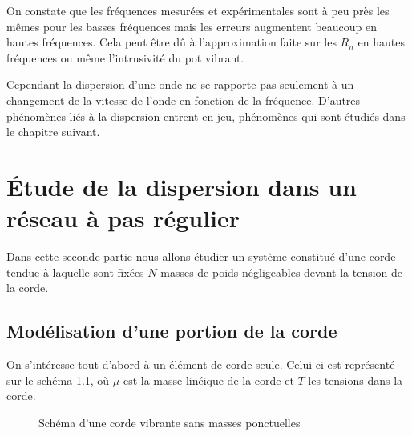 \documentclass[a4paper,11pt]{report} %
\begin{document}
\bigskip
On constate que les fréquences mesurées et expérimentales sont à peu près les mêmes pour les basses fréquences mais les erreurs augmentent beaucoup en hautes fréquences.  Cela peut être dû à l'approximation faite sur les $R_n$ en hautes fréquences ou même l'intrusivité du pot vibrant.

\bigskip \bigskip
Cependant la dispersion d'une onde ne se rapporte pas seulement à un changement de la vitesse de l'onde en fonction de la fréquence. D'autres phénomènes liés à la dispersion entrent en jeu, phénomènes qui sont étudiés dans le chapitre suivant.





\chapter{Étude de la dispersion dans un réseau à pas régulier}
Dans cette seconde partie nous allons étudier un système constitué d'une corde tendue à laquelle sont fixées $N$ masses de poids négligeables devant la tension de la corde.

\section{Modélisation d'une portion de la corde}

On s'intéresse tout d'abord à un élément de corde seule. Celui-ci est représenté sur le schéma \ref{schema_corde}, où $\mu$ est la masse linéique de la corde et $T$ les tensions dans la corde.\\

\begin{figure}[!h]
\caption{\label{schema_corde} Schéma d'une corde vibrante sans masses ponctuelles}
\end{figure}
\end{document}
